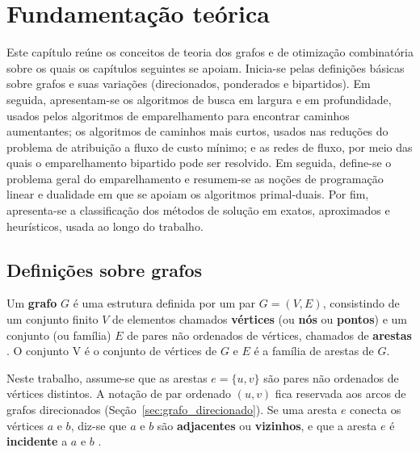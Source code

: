 \chapter{Fundamentação teórica}
\label{cap:fundamentacao}

Este capítulo reúne os conceitos de teoria dos grafos e de otimização combinatória sobre os quais os capítulos seguintes se apoiam. Inicia-se pelas definições básicas sobre grafos e suas variações (direcionados, ponderados e bipartidos). Em seguida, apresentam-se os algoritmos de busca em largura e em profundidade, usados pelos algoritmos de emparelhamento para encontrar caminhos aumentantes; os algoritmos de caminhos mais curtos, usados nas reduções do problema de atribuição a fluxo de custo mínimo; e as redes de fluxo, por meio das quais o emparelhamento bipartido pode ser resolvido. Em seguida, define-se o problema geral do emparelhamento e resumem-se as noções de programação linear e dualidade em que se apoiam os algoritmos primal-duais. Por fim, apresenta-se a classificação dos métodos de solução em exatos, aproximados e heurísticos, usada ao longo do trabalho.

\section{Definições sobre grafos}


Um \textbf{grafo} $G$ é uma estrutura definida por um par $G=(V,E)$, consistindo de um conjunto finito $V$ de elementos 
chamados \textbf{vértices} (ou \textbf{nós} ou \textbf{pontos}) e um conjunto (ou família) $E$ de pares não ordenados de vértices, 
chamados de \textbf{arestas} \cite{jungnickel}. O conjunto V é o conjunto de vértices de $G$ e $E$ é a família de arestas de 
$G$.

Neste trabalho, assume-se que as arestas $e=\{u,v\}$ são pares não ordenados de vértices distintos. A notação de par ordenado $(u,v)$ fica reservada aos arcos de grafos direcionados (Seção~\ref{sec:grafo_direcionado}). Se uma aresta $e$ 
conecta os vértices $a$ e $b$, diz-se que $a$ e $b$ são \textbf{adjacentes} ou \textbf{vizinhos}, e que a aresta $e$ é 
\textbf{incidente} a $a$ e $b$ \cite{schrijver}.

